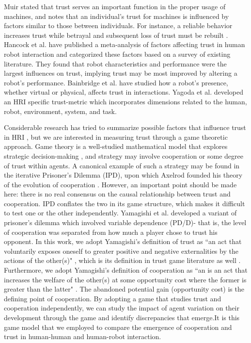 \documentclass{sig-alternate}
\begin{document}
Muir stated that trust serves an important function in the proper usage of machines, and notes that an individual's trust for machines is influenced by factors similar to those between individuals. For instance, a reliable behavior increases trust while betrayal and subsequent loss of trust must be rebuilt \cite{muir1987trust}. Hancock et al. \cite{hancock2011meta} have published a meta-analysis of factors affecting trust in human robot interaction and categorized these factors based on a survey of existing literature. They found that robot characteristics and performance were the largest influences on trust, implying trust may be most improved by altering a robot's performance. Bainbridge et al. \cite{bainbridge2008effect} have studied how a robot's presence, whether virtual or physical, affects trust in interactions. Yagoda et al. \cite{yagoda2012you} developed an HRI specific trust-metric which incorporates dimensions related to the human, robot, environment, system, and task. 

Considerable research has tried to summarize possible factors that influence trust in HRI \cite{yagoda2012you} \cite{billings2012human}, but  we are interested in measuring trust through a game theoretic approach. Game theory is a well-studied mathematical model that explores strategic decision-making \cite{myerson1991game}, and strategy may involve cooperation or some degree of trust within agents. A canonical example of such a strategy may be found in the iterative Prisoner's Dilemma (IPD), upon which Axelrod founded his theory of the evolution of cooperation \cite{axelrod1981evolution}. However, an important point should be made here: there is no real consensus on the causal relationship between trust and cooperation. IPD conflates the two in its game structure, which makes it difficult to test one or the other independently. Yamagishi et al. \cite{yamagishi2005separating} developed a variant of prisoner's dilemma which involved variable dependence (PD/D)- that is, the level of cooperation was separated from how much a player chose to trust his opponent. In this work, we adopt Yamagishi's definition of trust as ``an act that voluntarily exposes oneself to greater positive and negative externalities by the actions of the other(s)" \cite{yamagishi2005separating}, which is its definition in trust game literature as well \cite{dasgupta2000trust}. Furthermore, we adopt Yamagishi's definition of cooperation as ``an is an act that increases the welfare of the other(s) at
some opportunity cost where the former is greater than the latter" \cite{yamagishi2005separating}. The abandoned potential gain (opportunity cost) is the defining point of cooperation. By adopting a game that studies trust and cooperation independently, we can study the impact of agent variation on their development through the game and identify discrepancies that emerge.It is this game model that we employed to compare the emergence of cooperation and trust in human-human and human-robot interaction.
\end{document}
